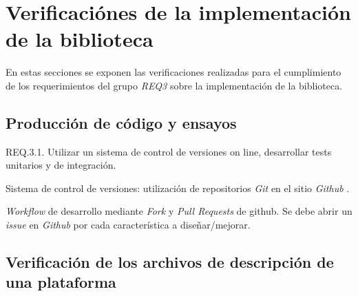 \section{Verificaciónes de la implementación de la biblioteca}

En estas secciones se exponen las verificaciones realizadas para el cumplimiento de los requerimientos del grupo \emph{REQ3} sobre la implementación de la biblioteca.

\subsection{Producción de código y ensayos}

REQ.3.1. Utilizar un sistema de control de versiones on line, desarrollar tests unitarios y de integración.

Sistema de control de versiones: utilización de repositorios \emph{Git} \citep{GIT} en el sitio \emph{Github} \citep{GITHUB}. 

\emph{Workflow} de desarrollo mediante \emph{Fork} y \emph{Pull Requests} de github. Se debe abrir un \emph{issue} en \emph{Github} por cada característica a diseñar/mejorar.


\label{sec:unitTest}

\label{sec:ci}






\subsection{Verificación de los archivos de descripción de una plataforma}


